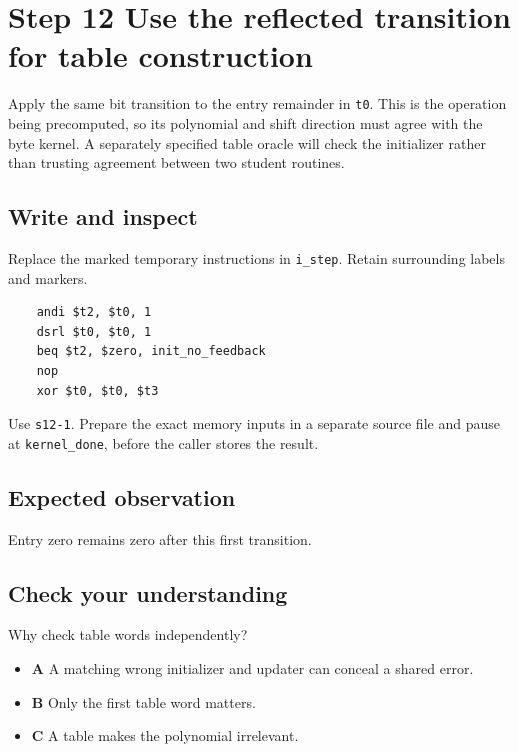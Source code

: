 \section{Step 12 Use the reflected transition for table construction}\label{crc-s12}

Apply the same bit transition to the entry remainder in \texttt{t0}. This is the operation being precomputed, so its polynomial and shift direction must agree with the byte kernel. A separately specified table oracle will check the initializer rather than trusting agreement between two student routines.

\subsection{Write and inspect}
Replace the marked temporary instructions in \texttt{i\_step}. Retain surrounding labels and markers.

\begin{verbatim}
    andi $t2, $t0, 1
    dsrl $t0, $t0, 1
    beq $t2, $zero, init_no_feedback
    nop
    xor $t0, $t0, $t3
\end{verbatim}

Use \texttt{s12-1}. Prepare the exact memory inputs in a separate source file and pause at \texttt{kernel\_done}, before the caller stores the result.

\subsection{Expected observation}
Entry zero remains zero after this first transition.

\subsection{Check your understanding}
Why check table words independently?

\begin{itemize}
  \item \textbf{A} A matching wrong initializer and updater can conceal a shared error.
  \item \textbf{B} Only the first table word matters.
  \item \textbf{C} A table makes the polynomial irrelevant.
\end{itemize}
